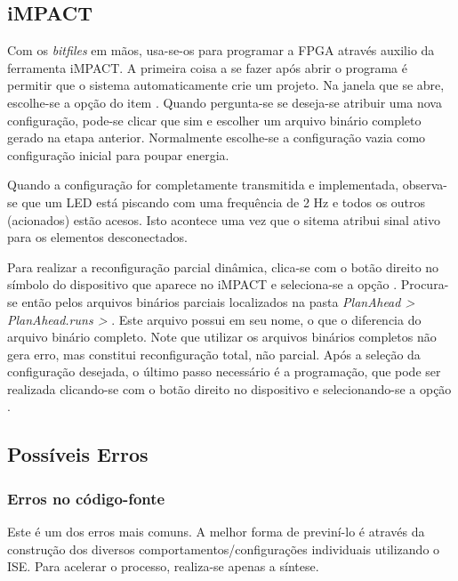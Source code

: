 \documentclass[11pt,a4paper,oneside]{book}
\begin{document}
\subsection{iMPACT}
Com os \textit{bitfiles} em mãos, usa-se-os para programar a FPGA através auxilio da ferramenta iMPACT. 
A primeira coisa a se fazer após abrir o programa é permitir que o sistema automaticamente crie um projeto.
Na janela que se abre, escolhe-se a opção  do item .
Quando pergunta-se se deseja-se atribuir uma nova configuração, pode-se clicar que sim e escolher um arquivo binário completo gerado na etapa anterior.
Normalmente escolhe-se a configuração vazia como configuração inicial para poupar energia.

Quando a configuração for completamente transmitida e implementada, observa-se que um LED está piscando com uma frequência de 2 Hz e todos os outros (acionados) estão acesos.
Isto acontece uma vez que o sitema atribui sinal ativo para os elementos desconectados.

Para realizar a reconfiguração parcial dinâmica, clica-se com o botão direito no símbolo do dispositivo que aparece no iMPACT e seleciona-se a opção .
Procura-se então pelos arquivos binários parciais localizados na pasta \textit{PlanAhead > PlanAhead.runs >} .
Este arquivo possui  em seu nome, o que o diferencia do arquivo binário completo.
Note que utilizar os arquivos binários completos não gera erro, mas constitui reconfiguração total, não parcial.
Após a seleção da configuração desejada, o último passo necessário é a programação, que pode ser realizada clicando-se com o botão direito no dispositivo e selecionando-se a opção .

\subsection{Possíveis Erros}
\subsubsection{Erros no código-fonte} Este é um dos erros mais comuns.
A melhor forma de previní-lo é através da construção dos diversos comportamentos/configurações individuais utilizando o ISE.
Para acelerar o processo, realiza-se apenas a síntese.
\end{document}
